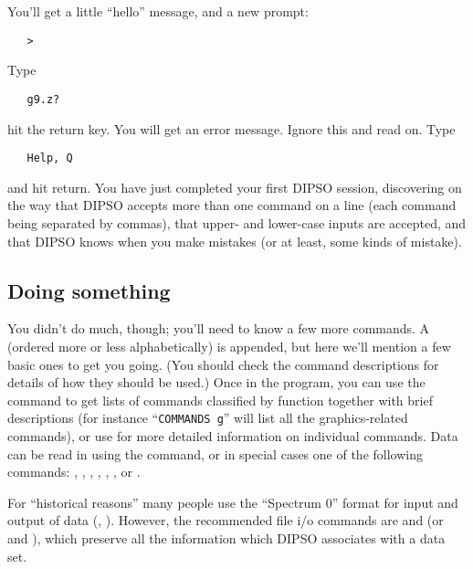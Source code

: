 You'll get a little ``hello'' message, and a new prompt:
\begin{verbatim}
   >
\end{verbatim}
Type
\begin{verbatim}
   g9.z?
\end{verbatim}
hit the return key. You will get an error message. Ignore this and 
read on. Type
\begin{verbatim}
   Help, Q
\end{verbatim}

and hit return. You have just completed your first DIPSO session,
discovering on the way that DIPSO accepts more than one command on a
line (each command being separated by commas), that upper- and
lower-case inputs are accepted, and that DIPSO knows when you make
mistakes (or at least, some kinds of mistake).

\subsection {Doing something}

You didn't do much, though; you'll need to know a few more commands. A
 (ordered more or less
alphabetically) is appended, but here we'll mention a few basic ones to
get you going. (You should check the command descriptions for details of
how they should be used.)
Once in the program, you can use the  
command to get lists of commands classified by function together with
brief descriptions (for instance ``\verb+COMMANDS g+'' will list all the
graphics-related commands), or use   for
more detailed information on individual commands.
Data can be read in using the   command, or
in special cases one of the following commands: , , 
,  , 
,  , 
or . 

For ``historical reasons'' many people use the ``Spectrum 0'' format
for input and output of data (,  ).  However, the
recommended file i/o commands are   and   (or
  and ),  which preserve all the information which
DIPSO associates with a data set.

